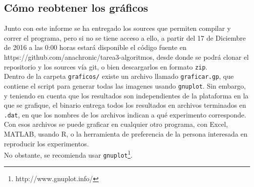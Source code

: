 \documentclass[12pt,letterpaper]{report}
\begin{document}
\subsection{Cómo reobtener los gráficos}
\label{subsec:gnuplot}
Junto con este informe se ha entregado los sources que permiten compilar y correr el programa, pero si no se tiene acceso a ello, a partir del 17 de Diciembre de 2016 a las 0:00 horas estará disponible el código fuente en https://github.com/anachronic/tarea3-algoritmos, desde donde se podrá clonar el repositorio y los sources vía git, o bien descargarlos en formato \texttt{zip}.\\

Dentro de la carpeta \texttt{graficos/} existe un archivo llamado \texttt{graficar.gp}, que contiene el script para generar todas las imagenes usando \texttt{gnuplot}. Sin embargo, y teniendo en cuenta que los resultados son independientes de la plataforma en la que se grafique, el binario entrega todos los resultados en archivos terminados en \texttt{.dat}, en que los nombres de los archivos indican a qué experimento corresponde. Con esos archivos se puede graficar en cualquier otro programa, con Excel, MATLAB, usando R, o la herramienta de preferencia de la persona interesada en reproducir los experimentos.\\

No obstante, se recomienda usar \texttt{gnuplot}\footnote{http://www.gnuplot.info/}.
\end{document}
